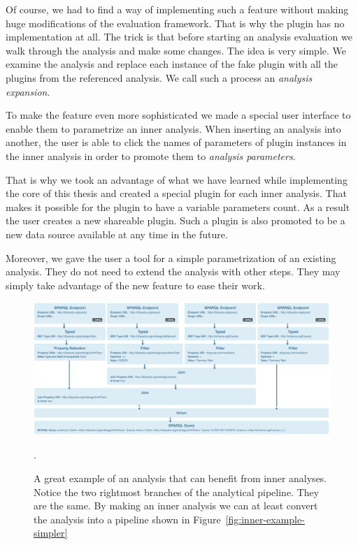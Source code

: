 Of course, we had to find a way of implementing such a feature without 
making huge modifications of the evaluation framework. That is why the plugin 
has no implementation at all. The trick is that before starting an analysis 
evaluation we walk through the analysis and make some changes. The idea is very 
simple. We examine the analysis and replace each instance of the fake plugin 
with all the plugins from the referenced analysis. We call such a process an 
\emph{analysis expansion}.

To make the feature even more sophisticated we made a special user interface to 
enable them to parametrize an inner analysis. When inserting an analysis into 
another, the user is able to click the names of parameters of plugin instances 
in the inner analysis in order to promote them to \emph{analysis parameters}.

That is why we took an advantage of what we have learned while implementing the 
core of this thesis and created a special plugin for each inner analysis. That 
makes it possible for the plugin to have a variable parameters count. As a result the 
user creates a new shareable plugin. Such a plugin is also promoted to be a new 
data source available at any time in the future.

Moreover, we gave the user a tool for a simple parametrization of an existing analysis. 
They do not need to extend the analysis with other steps. They may simply take 
advantage of the new feature to ease their work.

\begin{figure}
	\centering
	\includegraphics[width=140mm]{img/inner-example.png}
	\caption{A great example of an analysis that can benefit from inner analyses. Notice the
	two rightmost branches of the analytical pipeline. They are the same. By making
	an inner analysis we can at least convert the analysis into a pipeline shown in 
	Figure~\ref{fig:inner-example-simpler}}.
	\label{fig:inner-example}
\end{figure}

